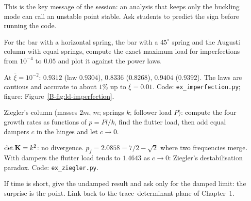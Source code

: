 \begin{instructor}
This is the key message of the session: an analysis that keeps only the buckling mode
can call an unstable point stable. Ask students to predict the sign before running the
code.
\end{instructor}


\qc For the bar with a horizontal spring, the bar with a $45^\circ$ spring and the
Augusti column with equal springs, compute the exact maximum load for imperfections
from $10^{-4}$ to $0.05$ and plot it against the power laws.
\begin{answer}
At $\bar\xi = 10^{-2}$: $0.9312$ (law $0.9304$), $0.8336$ ($0.8268$), $0.9404$ ($0.9392$).
The laws are cautious and accurate to about $1\%$ up to $\bar\xi = 0.01$. Code:
\texttt{ex\_imperfection.py}; figure: Figure~\ref{B-fig:ld-imperfection}.
\end{answer}

\qc Ziegler's column (masses $2m$, $m$; springs $k$; follower load $P$): compute the four
growth rates as functions of $p = Pl/k$, find the flutter load, then add equal dampers
$c$ in the hinges and let $c \to 0$.
\begin{answer}
$\det\mathbf{K} = k^2$: no divergence. $p_f = 2.0858 = 7/2 - \sqrt2$ where two frequencies
merge. With dampers the flutter load tends to $1.4643$ as $c \to 0$: Ziegler's
destabilisation paradox. Code: \texttt{ex\_ziegler.py}.
\end{answer}

\begin{instructor}
If time is short, give the undamped result and ask only for the damped limit: the
surprise is the point. Link back to the trace--determinant plane of Chapter~1.
\end{instructor}
